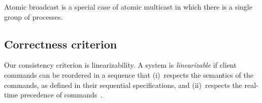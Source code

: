 Atomic broadcast is a special case of atomic multicast in which there
is a single group of processes.

\subsection{Correctness criterion}
\label{sec:correctcrit}

Our consistency criterion is linearizability.  A system is
\emph{linearizable} if client commands can be reordered
in a sequence that (i)~respects the semantics of the commands, as
defined in their sequential specifications, and (ii)~respects the
real-time precedence of commands~\cite{Attiya04}.


